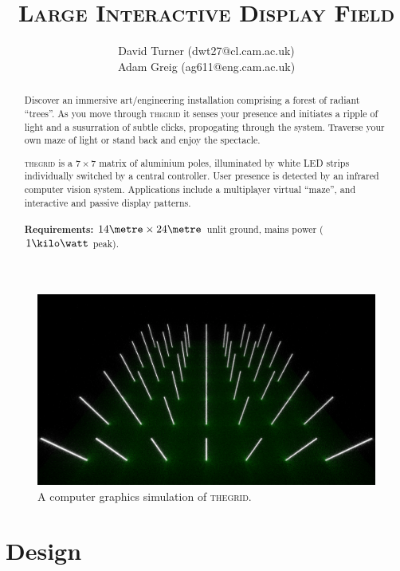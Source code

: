\documentclass[12pt]{article} %
\title{\thegrid\\\small{\textsc{Large Interactive Display Field}}}
\author{\small{David Turner (dwt27@cl.cam.ac.uk)}\\
        \small{Adam Greig (ag611@eng.cam.ac.uk)}}
\date{} %
\newcommand{\thegrid}{\textsc{the\textperiodcentered grid}\xspace}
\begin{document}
\maketitle

\renewcommand{\abstractname}{Summary}
\begin{abstract}
Discover an immersive art/engineering installation comprising a forest of
radiant ``trees''.  As you move through \thegrid it senses your presence and
initiates a ripple of light and a susurration of subtle clicks, propogating
through the system.  Traverse your own maze of light or stand back and enjoy
the spectacle.

\vspace{5mm}

\thegrid is a $7\times7$ matrix of aluminium poles, illuminated by white LED
strips individually switched by a central controller.  User presence is
detected by an infrared computer vision system.  Applications include a
multiplayer virtual ``maze'', and interactive and passive display patterns.
\\
~
\\
\textbf{Requirements:} $14\metre \times 24\metre$ unlit ground, mains power
($1\kilo\watt$ peak).
\end{abstract}

\begin{figure}[h]
    \centering
    \includegraphics[width=\textwidth]{pics/render1.png}
    \caption{A computer graphics simulation of \thegrid.}
\end{figure}

\clearpage
\section{Design}
\end{document}
